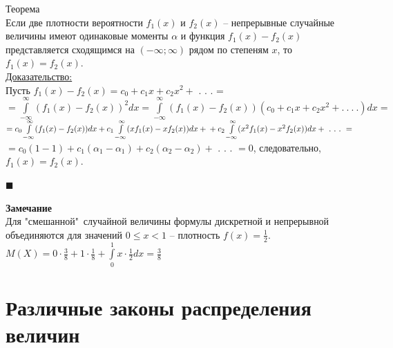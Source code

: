 \documentclass[russian, 12pt, fleqn]{article}
\begin{document}
$\textbf{Теорема}$\\
Если две плотности вероятности $f_1(x)$ и $f_2(x)$ -- непрерывные случайные величины имеют одинаковые моменты $\alpha$ и функция $f_1(x) - f_2(x)$ представляется сходящимся на $(-\infty;\infty)$ рядом по степеням $x$, то $f_1(x) = f_2(x)$.\\
\underline{Доказательство:}\\
Пусть $f_1(x) - f_2(x)= c_0 + c_1x + c_2x^2 +$ . . . =\\
$=\int\limits_{-\infty}^{\infty} (f_1(x) - f_2(x))^2dx = \int\limits_{-\infty}^{\infty} (f_1(x) - f_2(x))(c_0 + c_1x + c_2x^2 + .\ .\ .\ .)dx=$\\
$=c_0\int\limits_{-\infty}^{\infty}(f_1(x)-f_2(x))dx + c_1\int\limits_{-\infty}^{\infty}(xf_1(x) - xf_2(x))dx +\\ +   c_2\int\limits_{-\infty}^{\infty}(x^2f_1(x) - x^2f_2(x))dx  + \ . \ .\ .\ = $\\
$=c_0(1 - 1) + c_1(\alpha_1-\alpha_1) + c_2(\alpha_2 - \alpha_2) + $ . . . $=0$, следовательно, $f_1(x) = f_2(x)$.
\begin{flushright}\(\blacksquare\)\end{flushright}
\textbf{Замечание\ } \\ 
Для "смешанной"\  случайной величины формулы дискретной и непрерывной объединяются для значений $0\leq x< 1$ -- плотность $f(x) = \frac{1}{2}$.\\
$M(X) = 0\cdot \frac{3}{8} + 1\cdot \frac{1}{8} + \int\limits_{0}^{1}x\cdot \frac{1}{2} dx = \frac{3}{8}$

\section{Различные законы распределения величин}
\end{document}
